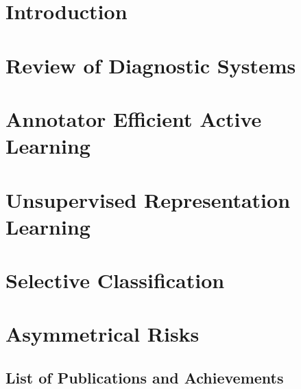 \documentclass[12pt]{report}
\begin{document}
	
	\chapter{Introduction}
	\label{ch:introduction}
	
	
	\chapter{Review of Diagnostic Systems}
	\label{ch:review_of_diagnostic_systems}
	
	
	\chapter{Annotator Efficient Active Learning}
	\label{ch:active_learning}
	
	
	\chapter{Unsupervised Representation Learning}
	\label{ch:unsupervised_representation_learning}
	
	
	\chapter{Selective Classification}
	\label{ch:selective_classification}
	
	
	\chapter{Asymmetrical Risks}
	\label{ch:asymmetrical_risks}
	
	
	
	
	\clearpage
	\renewcommand{\bibname}{References}
	
	
	
	\begin{appendices}
		\chapter{List of Publications and Achievements}
		\label{app:list_of_publications}
		
		
	\end{appendices}
	
\end{document}
